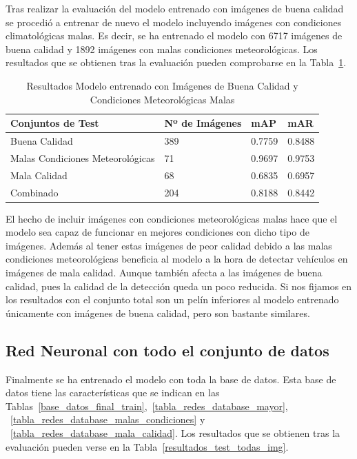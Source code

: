 Tras realizar la evaluación del modelo entrenado con imágenes de buena calidad se procedió a entrenar de nuevo el modelo incluyendo imágenes con condiciones climatológicas malas. Es decir, se ha entrenado el modelo con 6717 imágenes de buena calidad y 1892 imágenes con malas condiciones meteorológicas. Los resultados que se obtienen tras la evaluación pueden comprobarse en la Tabla~\ref{resultados_test_buenas_malas_condiciones}.

\begin{table}[H] 
\begin{center}
\begin{tabular}{|l|l|l|l|}
\hline
 Conjuntos de Test & Nº de Imágenes & mAP & mAR  \\ 
\hline \hline
Buena Calidad & 389 & 0.7759 & 0.8488 \\ \hline
Malas Condiciones Meteorológicas & 71 & 0.9697 & 0.9753 \\ \hline
Mala Calidad  & 68 & 0.6835 & 0.6957\\ \hline
Combinado & 204 & 0.8188 & 0.8442\\ \hline
\end{tabular}
\caption{Resultados Modelo entrenado con Imágenes de Buena Calidad y Condiciones Meteorológicas Malas}
\label{resultados_test_buenas_malas_condiciones}
\end{center}
\end{table}

El hecho de incluir imágenes con condiciones meteorológicas malas hace que el modelo sea capaz de funcionar en mejores condiciones con dicho tipo de imágenes. Además al tener estas imágenes de peor calidad debido a las malas condiciones meteorológicas beneficia al modelo a la hora de detectar vehículos en imágenes de mala calidad. Aunque también afecta a las imágenes de buena calidad, pues la calidad de la detección queda un poco reducida. Si nos fijamos en los resultados con el conjunto total son un pelín inferiores al modelo entrenado únicamente con imágenes de buena calidad, pero son bastante similares.


\subsection{Red Neuronal con todo el conjunto de datos}

Finalmente se ha entrenado el modelo con toda la base de datos. Esta base de datos tiene las características que se indican en las Tablas~\ref{base_datos_final_train},~\ref{tabla_redes_database_mayor}, ~\ref{tabla_redes_database_malas_condiciones} y ~\ref{tabla_redes_database_mala_calidad}. Los resultados que se obtienen tras la evaluación pueden verse en la Tabla~\ref{resultados_test_todas_img}.


